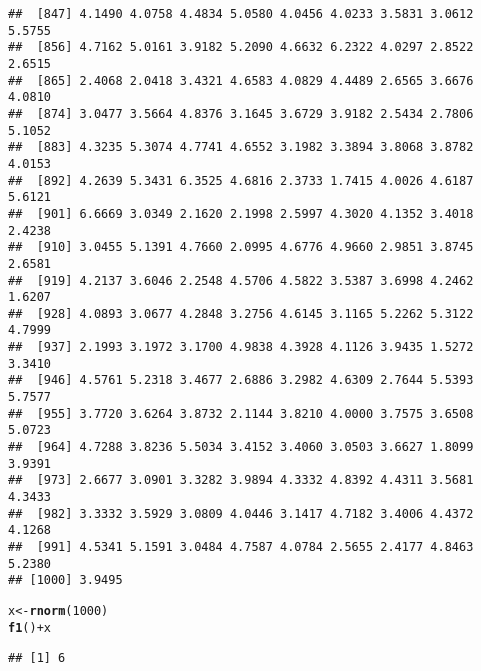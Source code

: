 \documentclass[12pt,a4paper]{scrartcl}\usepackage[]{graphicx}\usepackage[]{color}
\makeatletter
\newcommand{\hlnum}[1]{\textcolor[rgb]{0.686,0.059,0.569}{#1}}%
\newcommand{\hlopt}[1]{\textcolor[rgb]{0,0,0}{#1}}%
\newcommand{\hlstd}[1]{\textcolor[rgb]{0.345,0.345,0.345}{#1}}%
\newcommand{\hlkwb}[1]{\textcolor[rgb]{0.69,0.353,0.396}{#1}}%
\newcommand{\hlkwd}[1]{\textcolor[rgb]{0.737,0.353,0.396}{\textbf{#1}}}%
\newenvironment{kframe}{%
 \def\at@end@of@kframe{}%
 \ifinner\ifhmode%
  \def\at@end@of@kframe{\end{minipage}}%
  \begin{minipage}{\columnwidth}%
 \fi\fi%
 \def\FrameCommand##1{\hskip\@totalleftmargin \hskip-\fboxsep
 \colorbox{shadecolor}{##1}\hskip-\fboxsep
     \hskip-\linewidth \hskip-\@totalleftmargin \hskip\columnwidth}%
 \MakeFramed {\advance\hsize-\width
   \@totalleftmargin\z@ \linewidth\hsize
   \@setminipage}}%
 {\par\unskip\endMakeFramed%
 \at@end@of@kframe}
\newenvironment{knitrout}{}{} %
\makeatother
\begin{document}
\begin{Exercise}[difficulty=1, title={Understand the \texttt{<<-}}]
\begin{knitrout}
\begin{kframe}
\begin{verbatim}
##  [847] 4.1490 4.0758 4.4834 5.0580 4.0456 4.0233 3.5831 3.0612 5.5755
##  [856] 4.7162 5.0161 3.9182 5.2090 4.6632 6.2322 4.0297 2.8522 2.6515
##  [865] 2.4068 2.0418 3.4321 4.6583 4.0829 4.4489 2.6565 3.6676 4.0810
##  [874] 3.0477 3.5664 4.8376 3.1645 3.6729 3.9182 2.5434 2.7806 5.1052
##  [883] 4.3235 5.3074 4.7741 4.6552 3.1982 3.3894 3.8068 3.8782 4.0153
##  [892] 4.2639 5.3431 6.3525 4.6816 2.3733 1.7415 4.0026 4.6187 5.6121
##  [901] 6.6669 3.0349 2.1620 2.1998 2.5997 4.3020 4.1352 3.4018 2.4238
##  [910] 3.0455 5.1391 4.7660 2.0995 4.6776 4.9660 2.9851 3.8745 2.6581
##  [919] 4.2137 3.6046 2.2548 4.5706 4.5822 3.5387 3.6998 4.2462 1.6207
##  [928] 4.0893 3.0677 4.2848 3.2756 4.6145 3.1165 5.2262 5.3122 4.7999
##  [937] 2.1993 3.1972 3.1700 4.9838 4.3928 4.1126 3.9435 1.5272 3.3410
##  [946] 4.5761 5.2318 3.4677 2.6886 3.2982 4.6309 2.7644 5.5393 5.7577
##  [955] 3.7720 3.6264 3.8732 2.1144 3.8210 4.0000 3.7575 3.6508 5.0723
##  [964] 4.7288 3.8236 5.5034 3.4152 3.4060 3.0503 3.6627 1.8099 3.9391
##  [973] 2.6677 3.0901 3.3282 3.9894 4.3332 4.8392 4.4311 3.5681 4.3433
##  [982] 3.3332 3.5929 3.0809 4.0446 3.1417 4.7182 3.4006 4.4372 4.1268
##  [991] 4.5341 5.1591 3.0484 4.7587 4.0784 2.5655 2.4177 4.8463 5.2380
## [1000] 3.9495
\end{verbatim}
\begin{alltt}
\hlstd{x} \hlkwb{<-} \hlkwd{rnorm}\hlstd{(}\hlnum{1000}\hlstd{)}
\hlkwd{f1}\hlstd{()}\hlopt{+}\hlstd{x}
\end{alltt}
\begin{verbatim}
## [1] 6
\end{verbatim}
\end{kframe}
\end{knitrout}

\end{Exercise}

\begin{Answer}

\end{Answer}
\end{document}
